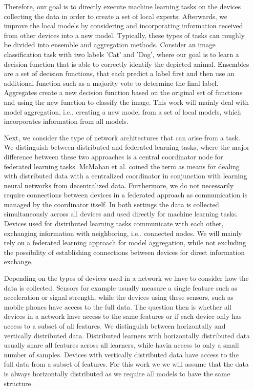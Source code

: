 Therefore, our goal is to directly execute machine learning tasks on the devices collecting the data in order to create a set of local experts.
Afterwards, we improve the local models by considering and incorporating information received from other devices into a new model.
Typically, these types of tasks can roughly be divided into ensemble and aggregation methods. 
Consider an image classification task with two labels 'Cat' and 'Dog', where our goal is to learn a decision function that is able to correctly identify the depicted animal.
Ensembles are a set of decision functions, that each predict a label first and then use an additional function such as a majority vote to determine the final label.
Aggregates create a new decision function based on the original set of functions and using the new function to classify the image.
This work will mainly deal with model aggregation, i.e., creating a new model from a set of local models, which incorporates information from all models.

Next, we consider the type of network architectures that can arise from a task. 
We distinguish between distributed and federated learning tasks, where the major difference between these two approaches is a central coordinator node for federated learning tasks.
McMahan et al. \cite{mcmahan2016communication} coined the term as means for dealing with distributed data with a centralized coordinator in conjunction with learning neural networks from decentralized data.
Furthermore, we do not necessarily require connections between devices in a federated approach as communication is managed by the coordinator itself.
In both settings the data is collected simultaneously across all devices and used directly for machine learning tasks.
Devices used for distributed learning tasks communicate with each other, exchanging information with neighboring, i.e., connected nodes.
We will mainly rely on a federated learning approach for model aggregation, while not excluding the possibility of establishing connections between devices for direct information exchange.

Depending on the types of devices used in a network we have to consider how the data is collected.
Sensors for example usually measure a single feature such as acceleration or signal strength, while the devices using these sensors, such as mobile phones have access to the full data.
The question then is whether all devices in a network have access to the same features or if each device only has access to a subset of all features.
We distinguish between horizontally and vertically distributed data.
Distributed learners with horizontally distributed data usually share all features across all learners, while havin access to only a small number of samples. 
Devices with vertically distributed data have access to the full data from a subset of features.
For this work we we will assume that the data is always horizontally distributed as we require all models to have the same structure.

